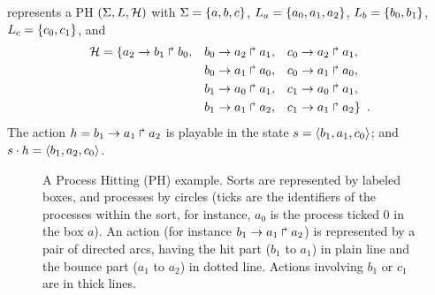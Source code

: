 \begin{example*}
 represents a PH $(\Sigma,L,\mathcal{H})$ with
$\Sigma = \{a,b,c\}$,
$L_a = \{a_0,a_1,a_2\}$,
$L_b = \{b_0, b_1\}$,
$L_c = \{c_0, c_1\}$, and
\begin{align*}
\mathcal{H} & = \{
	a_2\rightarrow b_1\Rsh b_0,
&&  b_0\rightarrow a_2\Rsh a_1,
&&	c_0\rightarrow a_2\Rsh a_1,\\
&&& b_0\rightarrow a_1\Rsh a_0,
&&	c_0\rightarrow a_1\Rsh a_0,\\
&&& b_1\rightarrow a_0\Rsh a_1,
&&	c_1\rightarrow a_0\Rsh a_1,\\
&&& b_1\rightarrow a_1\Rsh a_2,
&&	c_1\rightarrow a_1\Rsh a_2 \}\enspace.
\end{align*}
The action $h=b_1\rightarrow a_1\Rsh a_2$ is playable in the state
$s = \langle b_1,a_1,c_0 \rangle$; and $s\cdot h=\langle b_1,a_2,c_0 \rangle$.

\begin{figure}[t]
\centering
{}
\caption{\label{fig:runningPH-1}
A Process Hitting (PH) example.
Sorts are represented by labeled boxes, and processes by circles (ticks are
the identifiers of the processes within the sort, for instance, $a_0$ is the
process ticked $0$ in the box $a$).
An action (for instance $b_1\rightarrow a_1\Rsh a_2$) is represented by a pair of
directed arcs, having the hit part ($b_1$ to $a_1$) in plain line and the bounce
part ($a_1$ to $a_2$) in dotted line.
Actions involving $b_1$ or $c_1$ are in thick lines.
}
\end{figure}


\end{example*}
